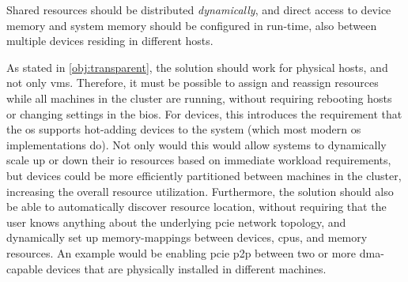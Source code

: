 \begin{objective}\label{obj:dynamic}
    Shared resources should be distributed \emph{dynamically}, and direct access to device memory and system memory should be configured in run-time, also between multiple devices residing in different hosts.
\end{objective}
As stated in \cref{obj:transparent}, the solution should work for physical hosts, and not only \glspl{vm}. Therefore, it must be possible to assign and reassign resources while all machines in the cluster are running, without requiring rebooting hosts or changing settings in the \gls{bios}.
For devices, this introduces the requirement that the \gls{os} supports hot-adding devices to the system (which most modern \gls{os} implementations do).
Not only would this would allow systems to dynamically scale up or down their \gls{io} resources based on immediate workload requirements, but devices could be more efficiently partitioned between machines in the cluster, increasing the overall resource utilization. 
Furthermore, the solution should also be able to automatically discover resource location, without requiring that the user knows anything about the underlying \gls{pcie} network topology, and dynamically set up memory-mappings between devices, \glspl{cpu}, and memory resources. An example would be enabling \gls{pcie} \gls{p2p} between two or more \gls{dma}-capable devices that are physically installed in different machines.

